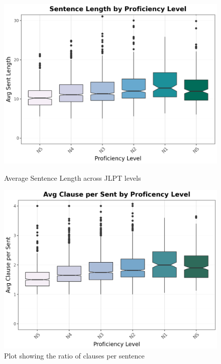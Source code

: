 \begin{figure}[htbp]
    \centering
    \begin{minipage}{.48\textwidth}
        \centering
    \includegraphics[scale=.3]{img/sentence_len}
    \caption[Average Sentence Length across JLPT levels]{Average Sentence Length across JLPT levels}
        \label{fig:sentLen}
    \end{minipage}
    \hfill
\begin{minipage}{.48\textwidth}
        \centering
        \includegraphics[scale=.3]{img/clausesSent}
        \caption[The ratio of clauses per sentence]{Plot showing the ratio of clauses per sentence}
\label{fig:cpersent}
\end{minipage}
    \end{figure}


